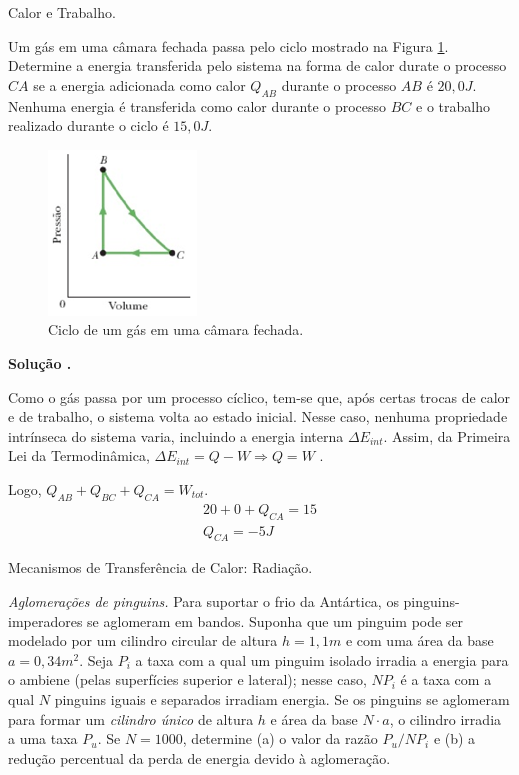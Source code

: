 \documentclass[a4paper, 12pt]{article}
\newenvironment{question}[2][Questão]{\begin{trivlist}
\item[\hskip \labelsep {\bfseries #1}\hskip \labelsep {\bfseries #2.}]}{\end{trivlist}}
\newenvironment{solving}[1][\unskip]{%
\vspace{0.2cm}

\noindent\textbf{ Solução #1.}
\vspace{0.1cm}

}
{}
\begin{document}
\vspace{0.3cm}
\begin{question}{2} Calor e Trabalho.

Um gás em uma câmara fechada passa pelo ciclo mostrado na Figura \ref{fig1}. Determine a energia transferida pelo sistema na forma de calor durate o processo $CA$ se a energia adicionada como calor $Q_{AB}$ durante o processo $AB$ é $20,0J$. Nenhuma energia é transferida como calor durante o processo $BC$ e o trabalho realizado durante o ciclo é $15,0J$.

\begin{figure}[!htb]
\centering
\includegraphics{Q2}
\caption{Ciclo de um gás em uma câmara fechada.}
\label{fig1}
\end{figure}
\end{question}
 
\begin{solving}
Como o gás passa por um processo cíclico, tem-se que, após certas trocas de calor e de trabalho, o sistema volta ao estado inicial. Nesse caso, nenhuma propriedade intrínseca do sistema varia, incluindo a energia interna $\Delta E_{int}$. Assim, da Primeira Lei da Termodinâmica, $\Delta E_{int}=Q-W \Rightarrow Q=W$ .

Logo,  $Q_{AB} + Q_{BC} + Q_{CA}= W_{tot}$.
\begin{gather*}
20 + 0 + Q_{CA}= 15\\
Q_{CA} = -5J
\end{gather*}
\end{solving}

\begin{question}{3} Mecanismos de Transferência de Calor: Radiação.

\emph{Aglomerações de pinguins.} Para suportar o frio da Antártica, os pinguins-imperadores se aglomeram em bandos. Suponha que um pinguim pode ser modelado por um cilindro circular de altura $h=1,1m$ e com uma área da base $a=0,34m^2$. Seja $P_i$ a taxa com a qual um pinguim isolado irradia a energia para o ambiene (pelas superfícies superior e lateral); nesse caso, $NP_{i}$ é a taxa com a qual $N$ pinguins iguais e separados irradiam energia. Se os pinguins se aglomeram para formar um \emph{cilindro único} de altura $h$ e área da base $N\cdot a$, o cilindro irradia a uma taxa $P_{u}$. Se $N=1000$, determine (a) o valor da razão $P_{u}/NP_{i}$ e (b) a redução percentual da perda de energia devido à aglomeração.
\end{question}
\end{document}
